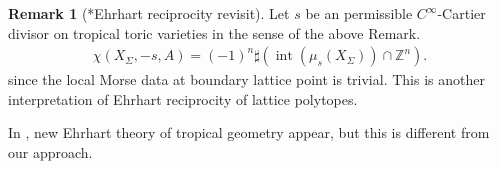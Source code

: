 \documentclass[a4paper,dvipdfmx,reqno,12pt]{amsart}
\theoremstyle{definition}
\newtheorem{remark}[theorem]{Remark}
\newcommand{\Z}{\mathbb{Z}}%
\newcommand{\opn}[1]{\operatorname{#1}}
\numberwithin{equation}{section}
\begin{document}
\begin{remark}[{*Ehrhart reciprocity revisit}]
Let $s$ be an permissible $C^{\infty}$-Cartier divisor on 
tropical toric varieties in the sense of the above Remark.
\begin{align}
\chi(X_{\Sigma},-s,A)=(-1)^{n}\sharp 
(\opn{int}(\mu_s(X_{\Sigma}))\cap \Z^{n}).
\end{align} since
the local Morse data at boundary lattice point is trivial.
This is another interpretation of Ehrhart reciprocity of 
lattice polytopes.
\end{remark}

In \cite{MR4155409},
new Ehrhart theory of tropical geometry appear, 
but this is different from our approach.

\iffalse
From definition,
\begin{align}
df(x)\notin \opn{lineal}(S,x)^{\bot} 
\Rightleftarrows df|_{\opn{lineal}(S,x)}(x)\ne 0
\end{align}

Fix a polyhedral fan structure $\mathscr{P}$ of 
$S/\opn{lineal}(S,x)$. The pullback induced from
$\opn{pr}\colon S\to S/\opn{lineal}(S,x)$ induces 
a fan structure on
$\bigcup_{x\in sigma \in \mathscr{P}}\sigma=
\opn{lineal}(S,x)$.

\fi





\printindex
\end{document}

